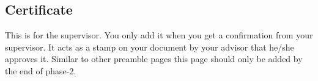 \begin{center}
  \section*{Certificate}
\end{center}


\begin{spacing}{1.5}
This is for the supervisor. You only add it when you get a confirmation from your supervisor. It acts as a stamp on your document by your advisor that he/she approves it. Similar to other preamble pages this page should only be added by the end of phase-2.

\end{spacing}

\begin{flushright}
  {\supervisorname}
\end{flushright}

\clearpage
\vspace*{2cm}